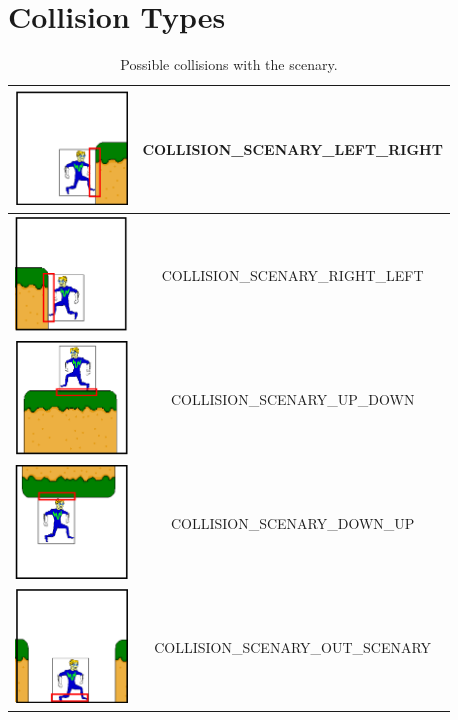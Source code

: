 	\section{Collision Types}
	\begin{table}[H]
    \caption{Possible collisions with the scenary.}
    \label{tab:scenaryCollisionTypes}
    \centering
	
    \begin{tabular}{|l|c|}
		\hline
		\includegraphics[width = 3cm]{img/leftright_collision.png} & COLLISION\_SCENARY\_LEFT\_RIGHT \\
		\hline
		\includegraphics[width = 3cm]{img/rightleft_collision.png} & COLLISION\_SCENARY\_RIGHT\_LEFT \\
		\hline
		\includegraphics[width = 3cm]{img/updown_collision.png} & COLLISION\_SCENARY\_UP\_DOWN \\
		\hline
		\includegraphics[width = 3cm]{img/downup_collision.png} & COLLISION\_SCENARY\_DOWN\_UP \\
		\hline
		\includegraphics[width = 3cm]{img/outscenary_collision.png} & COLLISION\_SCENARY\_OUT\_SCENARY \\
		\hline
	\end{tabular}
	\end{table}
	
